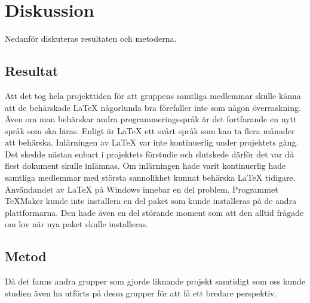 \section{Diskussion}
Nedanför diskuteras resultaten och metoderna. 
\subsection{Resultat}
Att det tog hela projekttiden för att gruppens samtliga medlemmar skulle känna att de behärskade {\LaTeX} någorlunda bra förefaller inte som någon överraskning. Även om man behärskar andra programmeringsspråk är det fortfarande en nytt språk som ska läras. Enligt \citep{latexandfriends} är {\LaTeX} ett svårt språk som kan ta flera månader att behärska. 
\newline
\newline
Inlärningen av {\LaTeX} var inte kontinuerlig under projektets gång. Det skedde nästan enbart i projektets förstudie och slutskede därför det var då flest dokument skulle inlämnas. Om inlärningen hade varit kontinuerlig hade samtliga medlemmar med största sannolikhet kunnat behärska {\LaTeX} tidigare.
\newline
\newline
Användandet av {\LaTeX} på Windows innebar en del problem. Programmet TeXMaker kunde inte installera en del paket som kunde installeras på de andra plattformarna. Den hade även en del störande moment som att den alltid frågade om lov när nya paket skulle installeras.  
 
\subsection{Metod}
Då det fanns andra grupper som gjorde liknande projekt samtidigt som oss kunde studien även ha utförts på dessa grupper för att få ett bredare perspektiv. 